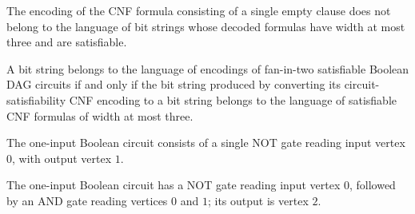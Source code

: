 \begin{theorem}
\label{BoolCircuit.not_mem_SAT3_serialize_nil}
\leanok
{}
The encoding of the CNF formula consisting of a single empty clause does not belong to
the language of bit strings whose decoded formulas have width at most three and are
satisfiable.
\end{theorem}

\begin{theorem}
\label{BoolCircuit.mem_dagCktSatLang_iff_mem_SAT3}
\leanok
{}
A bit string belongs to the language of encodings of fan-in-two satisfiable Boolean DAG
circuits if and only if the bit string produced by converting its circuit-satisfiability
CNF encoding to a bit string belongs to the language of satisfiable CNF formulas of
width at most three.
\end{theorem}

\begin{definition}
\label{BoolCircuit.notCircuit}
\leanok
{}
The one-input Boolean circuit consists of a single NOT gate reading input vertex $0$,
with output vertex $1$.
\end{definition}

\begin{definition}
\label{BoolCircuit.contraCircuit}
\leanok
{}
The one-input Boolean circuit has a NOT gate reading input vertex $0$, followed by an
AND gate reading vertices $0$ and $1$; its output is vertex $2$.
\end{definition}
